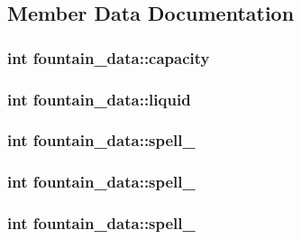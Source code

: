 \subsection{Member Data Documentation}
\hypertarget{structfountain__data_a8ba520a6a8cc4ab2c6167e43bb914122}{
\subsubsection[{capacity}]{\setlength{\rightskip}{0pt plus 5cm}int fountain\-\_\-data\-::capacity}}\label{structfountain__data_a8ba520a6a8cc4ab2c6167e43bb914122}
\hypertarget{structfountain__data_a006ae5eac053f0c50a1667e9bf39adbc}{
\subsubsection[{liquid}]{\setlength{\rightskip}{0pt plus 5cm}int fountain\-\_\-data\-::liquid}}\label{structfountain__data_a006ae5eac053f0c50a1667e9bf39adbc}
\hypertarget{structfountain__data_a4395698ebcfb50308bbe6892de853bd0}{
\subsubsection[{spell\-\_\-1}]{\setlength{\rightskip}{0pt plus 5cm}int fountain\-\_\-data\-::spell\-\_}}\label{structfountain__data_a4395698ebcfb50308bbe6892de853bd0}
\hypertarget{structfountain__data_aa9c2312107a9f55a29185d73f224efd5}{
\subsubsection[{spell\-\_\-2}]{\setlength{\rightskip}{0pt plus 5cm}int fountain\-\_\-data\-::spell\-\_}}\label{structfountain__data_aa9c2312107a9f55a29185d73f224efd5}
\hypertarget{structfountain__data_adf2c8f707cd32b9efd5f6a0aa69bcbef}{
\subsubsection[{spell\-\_\-3}]{\setlength{\rightskip}{0pt plus 5cm}int fountain\-\_\-data\-::spell\-\_}}\label{structfountain__data_adf2c8f707cd32b9efd5f6a0aa69bcbef}
